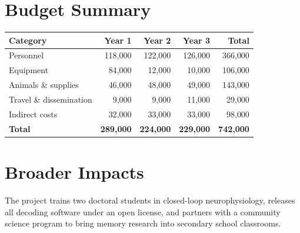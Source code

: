 \documentclass[11pt]{article}
\begin{document}
\section{Budget Summary}
\begin{tabularx}{\textwidth}{@{}lRRRR@{}}
\toprule
\textbf{Category} & \textbf{Year 1} & \textbf{Year 2} & \textbf{Year 3} & \textbf{Total} \\
\midrule
Personnel        & 118{,}000 & 122{,}000 & 126{,}000 & 366{,}000 \\
Equipment        &  84{,}000 &  12{,}000 &  10{,}000 & 106{,}000 \\
Animals \& supplies &  46{,}000 &  48{,}000 &  49{,}000 & 143{,}000 \\
Travel \& dissemination &  9{,}000 &  9{,}000 &  11{,}000 &  29{,}000 \\
Indirect costs   &  32{,}000 &  33{,}000 &  33{,}000 &  98{,}000 \\
\midrule
\textbf{Total}   & \textbf{289{,}000} & \textbf{224{,}000} & \textbf{229{,}000} & \textbf{742{,}000} \\
\bottomrule
\end{tabularx}

\section{Broader Impacts}
The project trains two doctoral students in closed-loop neurophysiology, releases
all decoding software under an open license, and partners with a community
science program to bring memory research into secondary school classrooms.
\end{document}
